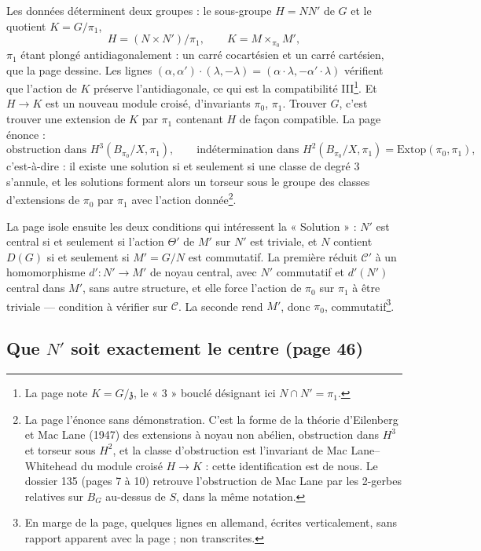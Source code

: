 \documentclass[11pt,a4paper]{article}
\begin{document}
Les données déterminent deux groupes : le sous-groupe $H = NN'$ de $G$ et le
quotient $K = G/\pi_1$,
\[
H = (N \times N')/\pi_1, \qquad K = M \times_{\pi_0} M',
\]
$\pi_1$ étant plongé antidiagonalement : un carré cocartésien et un carré
cartésien, que la page dessine. Les lignes
$(\alpha, \alpha') \cdot (\lambda, -\lambda) = (\alpha \cdot \lambda,
-\alpha' \cdot \lambda)$ vérifient que l'action de $K$ préserve
l'antidiagonale, ce qui est la compatibilité III\footnote{La page note $K =
G/\mathfrak{z}$, le « 3 » bouclé désignant ici $N \cap N' = \pi_1$.}. Et
$H \to K$ est un nouveau module croisé, d'invariants $\pi_0$, $\pi_1$.
Trouver $G$, c'est trouver une extension de $K$ par $\pi_1$ contenant $H$ de
façon compatible. La page énonce :
\[
\text{obstruction dans } H^{3}(B_{\pi_0}/X, \pi_1), \qquad
\text{indétermination dans } H^{2}(B_{\pi_0}/X, \pi_1) =
\mathrm{Extop}(\pi_0, \pi_1),
\]
c'est-à-dire : il existe une solution si et seulement si une classe de
degré $3$ s'annule, et les solutions forment alors un torseur sous le groupe
des classes d'extensions de $\pi_0$ par $\pi_1$ avec l'action
donnée\footnote{La page l'énonce sans démonstration. C'est la forme de la
théorie d'Eilenberg et Mac Lane (1947) des extensions à noyau non
abélien, obstruction dans $H^{3}$ et torseur sous $H^{2}$, et la classe
d'obstruction est l'invariant de Mac Lane–Whitehead du module croisé
$H \to K$ : cette identification est de nous. Le dossier 135 (pages 7 à 10)
retrouve l'obstruction de Mac Lane par les 2-gerbes relatives sur $B_G$ au-dessus de
$S$, dans la même notation.}.

La page isole ensuite les deux conditions qui intéressent la « Solution » :
$N'$ est central si et seulement si l'action $\Theta'$ de $M'$ sur $N'$ est
triviale, et $N$ contient $D(G)$ si et seulement si $M' = G/N$ est
commutatif. La première réduit $\mathcal{C}'$ à un homomorphisme
$d' \colon N' \to M'$ de noyau central, avec $N'$ commutatif et $d'(N')$
central dans $M'$, sans autre structure, et elle force l'action de
$\pi_0$ sur $\pi_1$ à être triviale — condition à vérifier sur
$\mathcal{C}$. La seconde rend $M'$, donc $\pi_0$, commutatif\footnote{En
marge de la page, quelques lignes en allemand, écrites verticalement, sans
rapport apparent avec la page ; non transcrites.}.

\subsection*{Que $N'$ soit exactement le centre (page 46)}
\end{document}
